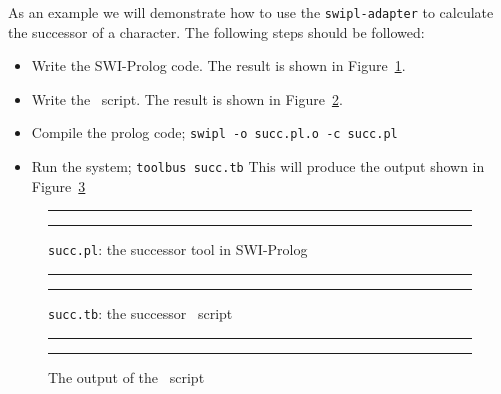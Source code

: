 As an example we will demonstrate how to use the {\tt swipl-adapter} to
calculate the successor of a character. The following steps should be
followed:

\begin{itemize}
\item Write the SWI-Prolog code. The result is shown in
Figure~\ref{fig:succ.pl}.
\item Write the \T\ script. The result is shown in
Figure~\ref{fig:succ.tb}.
\item Compile the prolog code; {\tt swipl -o succ.pl.o -c succ.pl}
\item Run the system; {\tt toolbus succ.tb}
This will produce the output shown in
Figure~\ref{fig:succ.output}
\end{itemize}

\begin{figure}
\rule{\textwidth}{0.5mm}

	\caption{{\tt succ.pl}: the successor tool in SWI-Prolog}
	\label{fig:succ.pl}
\rule{\textwidth}{0.5mm}
\end{figure}

\begin{figure}
\rule{\textwidth}{0.5mm}

	\caption{{\tt succ.tb}: the successor \T\ script}
	\label{fig:succ.tb}
\rule{\textwidth}{0.5mm}
\end{figure}

\begin{figure}
\rule{\textwidth}{0.5mm}

	\caption{The output of the \T\ script}
	\label{fig:succ.output}
\rule{\textwidth}{0.5mm}
\end{figure}


